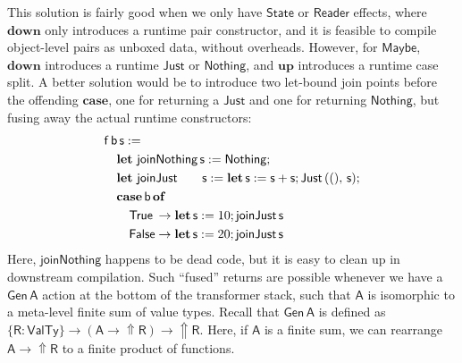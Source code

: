 \documentclass[acmsmall]{acmart}
\newcommand{\msf}[1]{{\mathsf{#1}}}
\newcommand{\mbf}[1]{{\mathbf{#1}}}
\newcommand{\ind}{\hspace{1em}}
\newcommand{\of}{\mbf{of}\,}
\newcommand{\letdef}{\mbf{let\,}}
\newcommand{\vA}{\mathsf{A}}
\newcommand{\vR}{\mathsf{R}}
\newcommand{\vb}{\mathsf{b}}
\newcommand{\vf}{\mathsf{f}}
\newcommand{\vs}{\mathsf{s}}
\newcommand{\Reader}{\msf{Reader}}
\newcommand{\case}{\mbf{case\,}}
\newcommand{\Up}{{\Uparrow}}
\newcommand{\VTy}{\msf{ValTy}}
\newcommand{\True}{\msf{True}}
\newcommand{\False}{\msf{False}}
\newcommand{\Maybe}{\msf{Maybe}}
\newcommand{\Nothing}{\msf{Nothing}}
\newcommand{\Just}{\msf{Just}}
\theoremstyle{remark}
\newcommand{\mup}{\mbf{up}}
\newcommand{\mdown}{\mbf{down}}
\newcommand{\Gen}{\msf{Gen}}
\newcommand{\State}{\msf{State}}
\begin{document}
This solution is fairly good when we only have $\State$ or $\Reader$ effects, where
$\mdown$ only introduces a runtime pair constructor, and it is feasible to
compile object-level pairs as unboxed data, without overheads. However, for
$\Maybe$, $\mdown$ introduces a runtime $\Just$ or $\Nothing$, and $\mup$
introduces a runtime case split. A better solution would be to introduce two
let-bound join points before the offending $\mbf{case}$, one for returning a
$\Just$ and one for returning $\Nothing$, but fusing away the actual runtime
constructors:
\begin{alignat*}{3}
  & \vf\,\vb\,\vs :=\\
  & \ind \letdef\,\msf{joinNothing}\,\vs := \Nothing;\\
  & \ind \letdef\,\msf{joinJust}\,\hspace{1.8em}\vs := \letdef \vs := \vs + \vs; \Just\,((),\,\vs);\\
  & \ind \case \msf{b}\,\of\\
  & \ind \ind \True\hspace{0.2em}  \to \letdef \vs := 10; \msf{joinJust}\,\vs\\
  & \ind \ind \False \to \letdef \vs := 20; \msf{joinJust}\,\vs
\end{alignat*}
Here, $\msf{joinNothing}$ happens to be dead code, but it is easy to clean up in
downstream compilation. Such ``fused'' returns are possible whenever we have a
$\Gen\,\vA$ action at the bottom of the transformer stack, such that $\vA$ is
isomorphic to a meta-level finite sum of value types. Recall that $\Gen\,\vA$ is
defined as $\{\vR : \VTy\} \to (\vA \to \Up \vR) \to \Up \vR$. Here, if $\vA$ is
a finite sum, we can rearrange $\vA \to \Up \vR$ to a finite product of
functions.
\end{document}
